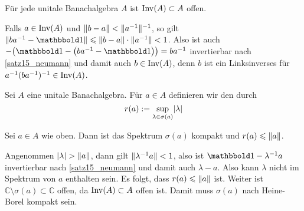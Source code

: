 \begin{korollar}[{name=[Invertierbare Elemente bilden offene Menge]},label=inv_offen]
	Für jede unitale Banachalgebra $A$ ist $\operatorname{Inv}(A) \subset A$ offen.
\end{korollar}
\begin{beweis}
	Falls $a \in \operatorname{Inv}(A)$ und $\Vert b-a\Vert < \Vert a^{-1}\Vert^{-1}$, so gilt $\norm{b a^{-1} -\ind} \le \norm{b-a} \cdot \norm{a^{-1}}<1$.  Also ist auch
	$-\enbrace*{\ind- \enbrace*{ba^{-1} -\ind}} = ba^{-1}$ invertierbar nach \autoref{satz15_neumann} und damit auch $b \in \operatorname{Inv}(A)$, denn $b$ ist ein Linksinverses für 
	$a^{-1}(ba^{-1})^{-1} \in \operatorname{Inv}(A)$.
\end{beweis}

\begin{definition}[{name=[Spektralradius]}]
	Sei $A$ eine unitale Banachalgebra. Für $a \in A$ definieren wir den  durch
	\[
		r(a) := \sup_{\lambda \in \sigma(a)} \lvert\lambda\rvert 
	\] 
\end{definition}

\begin{proposition}[{name=[Spektrum ist kompakt und Spektralradius durch Norm beschränkt]},label=spec_kompakt]
	Sei $a \in A$ wie oben. Dann ist das Spektrum $\sigma(a)$ kompakt und $r(a) \leqslant \Vert a\Vert$.
\end{proposition}
\begin{beweis}
	Angenommen $\lvert\lambda\rvert > \Vert a\Vert$, dann gilt $\Vert\lambda^{-1} a\Vert < 1$, also ist $\ind- \lambda^{-1} a$ invertierbar nach \autoref{satz15_neumann} und 
	damit auch $\lambda -a $. Also kann $\lambda$ nicht im Spektrum von $a$ enthalten sein. 
	Es folgt, dass $r(a) \leqslant \Vert a\Vert$ ist. 	
	Weiter ist $\mathbb{C} \setminus \sigma(a) \subset \mathbb{C}$ offen, da $\operatorname{Inv}(A) \subset A$ offen ist. Damit muss $\sigma(a)$ nach Heine-Borel kompakt sein.
\end{beweis}

